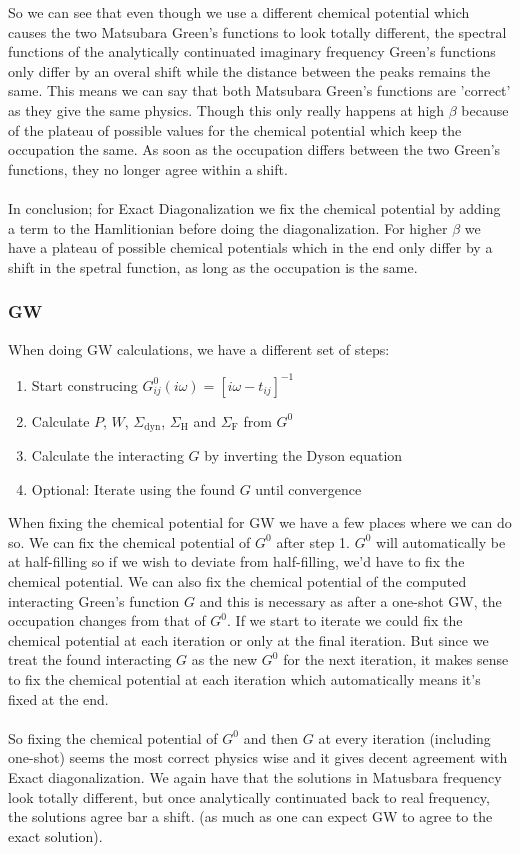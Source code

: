 \documentclass[12pt]{article}
\begin{document}
So we can see that even though we use a different chemical potential which causes the two Matsubara Green's functions to look totally different, the spectral functions of the analytically continuated imaginary frequency Green's functions only differ by an overal shift while the distance between the peaks remains the same. This means we can say that both Matsubara Green's functions are 'correct' as they give the same physics. Though this only really happens at high $\beta$ because of the plateau of possible values for the chemical potential which keep the occupation the same. As soon as the occupation differs between the two Green's functions, they no longer agree within a shift.\\
\\
In conclusion; for Exact Diagonalization we fix the chemical potential by adding a term to the Hamlitionian before doing the diagonalization. For higher $\beta$ we have a plateau of possible chemical potentials which in the end only differ by a shift in the spetral function, as long as the occupation is the same.
\subsubsection*{GW}
When doing GW calculations, we have a different set of steps:
\begin{enumerate}
	\item Start construcing $G_{ij}^0(i\omega)=[i\omega -t_{ij}]^{-1}$
	\item Calculate $P$, $W$, $\Sigma_\text{dyn}$, $\Sigma_\text{H}$ and $\Sigma_\text{F}$ from $G^0$
	\item Calculate the interacting $G$ by inverting the Dyson equation
	\item Optional: Iterate using the found $G$ until convergence
\end{enumerate}
When fixing the chemical potential for GW we have a few places where we can do so. We can fix the chemical potential of $G^0$ after step 1. $G^0$ will automatically be at half-filling so if we wish to deviate from half-filling, we'd have to fix the chemical potential. We can also fix the chemical potential of the computed interacting Green's function $G$ and this is necessary as after a one-shot GW, the occupation changes from that of $G^0$.
\newpage
\noindent
If we start to iterate we could fix the chemical potential at each iteration or only at the final iteration. But since we treat the found interacting $G$ as the new $G^0$ for the next iteration, it makes sense to fix the chemical potential at each iteration which automatically means it's fixed at the end.\\
\\
So fixing the chemical potential of $G^0$ and then $G$ at every iteration (including one-shot) seems the most correct physics wise and it gives decent agreement with Exact diagonalization. We again have that the solutions in Matusbara frequency look totally different, but once analytically continuated back to real frequency, the solutions agree bar a shift. (as much as one can expect GW to agree to the exact solution).
\end{document}
